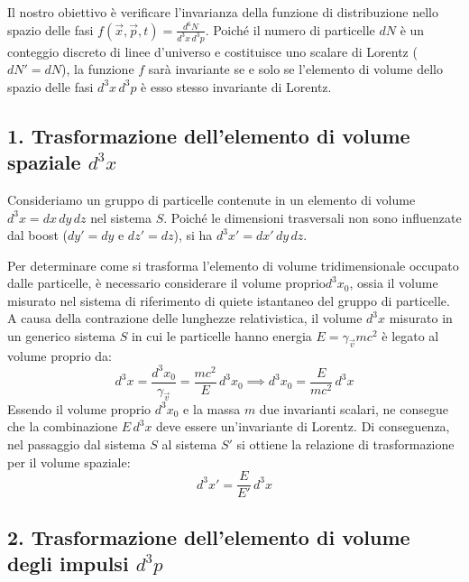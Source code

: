 \documentclass[11pt, a4paper, oneside]{scrreprt}
\begin{document}
Il nostro obiettivo è verificare l'invarianza della funzione di distribuzione nello spazio delle fasi $f(\vec{x}, \vec{p}, t) = \frac{d^6N}{d^3x \, d^3p}$.
Poiché il numero di particelle $dN$ è un conteggio discreto di linee d'universo e costituisce uno scalare di Lorentz ($dN' = dN$), la funzione $f$ sarà invariante se e solo se l'elemento di volume dello spazio delle fasi $d^3x \, d^3p$ è esso stesso invariante di Lorentz.

\subsection*{1. Trasformazione dell'elemento di volume spaziale $d^3x$}

Consideriamo un gruppo di particelle contenute in un elemento di volume $d^3x = dx \, dy \, dz$ nel sistema $S$. Poiché le dimensioni trasversali non sono influenzate dal boost ($dy' = dy$ e $dz' = dz$), si ha $d^3x' = dx' \, dy \, dz$.

Per determinare come si trasforma l'elemento di volume tridimensionale occupato dalle particelle, è necessario considerare il volume proprio$d^3x_0$, ossia il volume misurato nel sistema di riferimento di quiete istantaneo del gruppo di particelle. A causa della contrazione delle lunghezze relativistica, il volume $d^3x$ misurato in un generico sistema $S$ in cui le particelle hanno energia $E = \gamma_{\vec{v}} mc^2$ è legato al volume proprio da:
\begin{equation}
    d^3x = \frac{d^3x_0}{\gamma_{\vec{v}}} = \frac{mc^2}{E} \, d^3x_0 \implies d^3x_0 = \frac{E}{mc^2} \, d^3x
\end{equation}
Essendo il volume proprio $d^3x_0$ e la massa $m$ due invarianti scalari, ne consegue che la combinazione $E \, d^3x$ deve essere un'invariante di Lorentz. Di conseguenza, nel passaggio dal sistema $S$ al sistema $S'$ si ottiene la relazione di trasformazione per il volume spaziale:
\begin{equation} \label{eq:volume_trasformazione}
    d^3x' = \frac{E}{E'} \, d^3x
\end{equation}

\subsection*{2. Trasformazione dell'elemento di volume degli impulsi $d^3p$}
\end{document}
